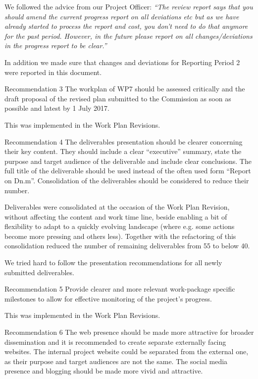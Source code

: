 We followed the advice from our Project Officer: \emph{``The review
report says that you should amend the current progress report on all
deviations etc but as we have already started to process the report
and cost, you don’t need to do that anymore for the past period.
However, in the future please report on all changes/deviations in the
progress report to be clear.''}

In addition we made sure that changes and deviations for Reporting
Period 2 were reported in this document.

\begin{recommendation}{Recommendation 3}
  The workplan of WP7 should be assessed critically and the draft
  proposal of the revised plan submitted to the Commission as soon as
  possible and latest by 1 July 2017.
\end{recommendation}

This was implemented in the Work Plan Revisions.

\begin{recommendation}{Recommendation 4}
  The deliverables presentation should be clearer concerning their key
  content. They should include a clear ``executive'' summary, state
  the purpose and target audience of the deliverable and include clear
  conclusions. The full title of the deliverable should be used
  instead of the often used form ``Report on Dn.m''. Consolidation of
  the deliverables should be considered to reduce their number.
\end{recommendation}

Deliverables were consolidated at the occasion of the Work Plan
Revision, without affecting the content and work time line, beside
enabling a bit of flexibility to adapt to a quickly evolving landscape
(where e.g. some actions become more pressing and others less).
Together with the refactoring of  this
consolidation reduced the number of remaining deliverables from 55 to
below 40.

We tried hard to follow the presentation recommendations for all newly
submitted deliverables.

\begin{recommendation}{Recommendation 5}
  Provide clearer and more relevant work-package specific milestones
  to allow for effective monitoring of the project's progress.
\end{recommendation}

This was implemented in the Work Plan Revisions.

\begin{recommendation}{Recommendation 6}
  The web presence should be made more attractive for broader
  dissemination and it is recommended to create separate externally
  facing websites. The internal project website could be separated from
  the external one, as their purpose and target audiences are not the
  same. The social media presence and blogging should be made more
  vivid and attractive.
\end{recommendation}

